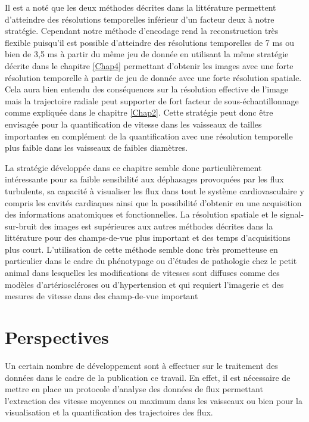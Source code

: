Il est a noté que les deux méthodes décrites dans la littérature permettent d'atteindre des résolutions temporelles inférieur d'un facteur deux à notre stratégie. Cependant notre méthode d'encodage rend la reconstruction très flexible puisqu'il est possible d'atteindre des résolutions temporelles de 7 ms ou bien de 3,5 ms à partir du même jeu de donnée en utilisant la même stratégie décrite dans le chapitre \ref{Chap4} permettant d'obtenir les images avec une forte résolution temporelle à partir de jeu de donnée avec une forte résolution spatiale. Cela aura bien entendu des conséquences sur la résolution effective de l'image mais  la trajectoire radiale peut supporter de fort facteur de sous-échantillonnage comme expliquée dans le chapitre \ref{Chap2}. Cette stratégie peut donc être envisagée pour la quantification de vitesse dans les vaisseaux de tailles importantes en complément de la quantification avec une résolution temporelle plus faible dans les vaisseaux de faibles diamètres.

La stratégie développée dans ce chapitre semble donc particulièrement intéressante pour sa faible sensibilité aux déphasages provoquées par les flux turbulents, sa capacité à visualiser les flux dans tout le système cardiovasculaire y compris les cavités cardiaques ainsi que la possibilité d'obtenir en une acquisition des informations anatomiques et fonctionnelles. La résolution spatiale et le signal-sur-bruit des images est supérieures aux autres méthodes décrites dans la littérature pour des champs-de-vue plus important et des temps d'acquisitions plus court. L'utilisation de cette méthode semble donc très prometteuse en particulier dans le cadre du phénotypage ou d'études de pathologie chez le petit animal dans lesquelles les modifications de vitesses sont diffuses comme des modèles d'artérioscléroses ou d'hypertension et qui requiert l'imagerie et des mesures de vitesse dans des champ-de-vue important


\section{Perspectives}

Un certain nombre de développement sont à effectuer sur le traitement des données dans le cadre de la publication ce travail. En effet, il est nécessaire de mettre en place un protocole d'analyse des données de flux permettant l'extraction des vitesse moyennes ou maximum dans les vaisseaux ou bien pour la visualisation et la quantification des trajectoires des flux.

